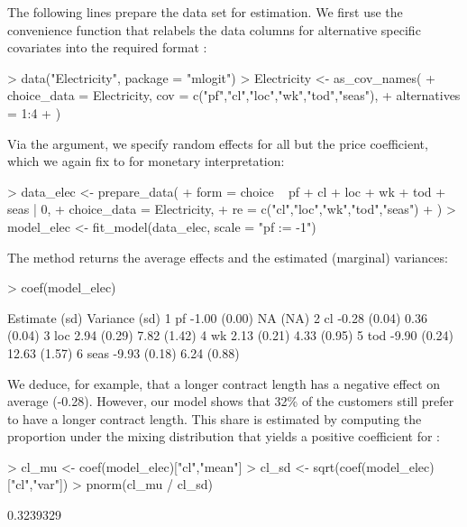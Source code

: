 \documentclass[article,shortnames]{jss}
\newcommand{\fct}[1]{\code{#1()}}
\begin{document}
The following lines prepare the data set for estimation. We first use the convenience function \fct{as\_cov\_names} that relabels the data columns for alternative specific covariates into the required format :

\begin{Schunk}
\begin{Sinput}
> data("Electricity", package = "mlogit")
> Electricity <- as_cov_names(
+    choice_data = Electricity, cov = c("pf","cl","loc","wk","tod","seas"),
+    alternatives = 1:4
+  )
\end{Sinput}
\end{Schunk}

Via the  argument, we specify random effects for all but the price coefficient, which we again fix to  for monetary interpretation:

\begin{Schunk}
\begin{Sinput}
> data_elec <- prepare_data(
+    form = choice ~ pf + cl + loc + wk + tod + seas | 0,
+    choice_data = Electricity,
+    re = c("cl","loc","wk","tod","seas")
+  )
> model_elec <- fit_model(data_elec, scale = "pf := -1")
\end{Sinput}
\end{Schunk}

The \fct{coef} method returns the average effects and the estimated (marginal) variances:

\begin{Schunk}
\begin{Sinput}
> coef(model_elec)
\end{Sinput}
\begin{Soutput}
        Estimate   (sd) Variance   (sd)
1   pf     -1.00 (0.00)       NA   (NA)
2   cl     -0.28 (0.04)     0.36 (0.04)
3  loc      2.94 (0.29)     7.82 (1.42)
4   wk      2.13 (0.21)     4.33 (0.95)
5  tod     -9.90 (0.24)    12.63 (1.57)
6 seas     -9.93 (0.18)     6.24 (0.88)
\end{Soutput}
\end{Schunk}

We deduce, for example, that a longer contract length has a negative effect on average (-0.28). However, our model shows that 32\% of the customers still prefer to have a longer contract length. This share is estimated by computing the proportion under the mixing distribution that yields a positive coefficient for :

\begin{Schunk}
\begin{Sinput}
> cl_mu <- coef(model_elec)["cl","mean"]
> cl_sd <- sqrt(coef(model_elec)["cl","var"])
> pnorm(cl_mu / cl_sd)
\end{Sinput}
\begin{Soutput}
[1] 0.3239329
\end{Soutput}
\end{Schunk}
\end{document}
